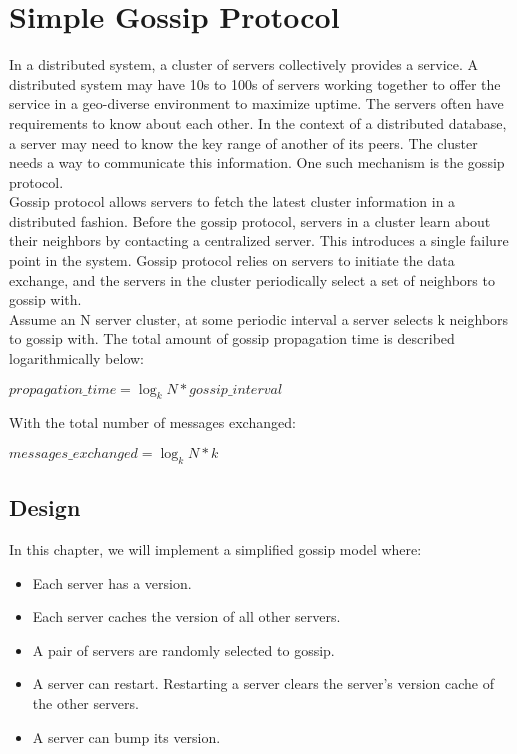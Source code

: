 % 

\chapter{Simple Gossip Protocol}

In a distributed system, a cluster of servers collectively provides a service. A
distributed system may have 10s to 100s of servers working together to offer the
service in a geo-diverse environment to maximize uptime. The servers often
have requirements to know about each other. In the context of a distributed
database, a server may need to know the key range of another of its peers. The
cluster needs a way to communicate this information. One such mechanism is the
gossip protocol.\\

Gossip protocol allows servers to fetch the latest cluster information in a
distributed fashion. Before the gossip protocol, servers in a cluster learn about
their neighbors by contacting a centralized server. This introduces a single
failure point in the system. Gossip protocol relies on servers to initiate
the data exchange, and the servers in the cluster periodically select a set of
neighbors to gossip with.\\

Assume an N server cluster, at some periodic interval a server selects k neighbors
to gossip with. The total amount of gossip propagation time is described
logarithmically below:

\begin{center}
$propagation\_time = \log_k N * gossip\_interval$
\end{center}

With the total number of messages exchanged:
\begin{center}
$messages\_exchanged = \log_k N * k$
\end{center}

\section{Design}

In this chapter, we will implement a simplified gossip model where: 
\begin{itemize}
    \item Each server has a version.
    \item Each server caches the version of all other servers.
    \item A pair of servers are randomly selected to gossip.
    \item A server can restart. Restarting a server clears the server's version cache
    of the other servers.
    \item A server can bump its version.
\end{itemize}


